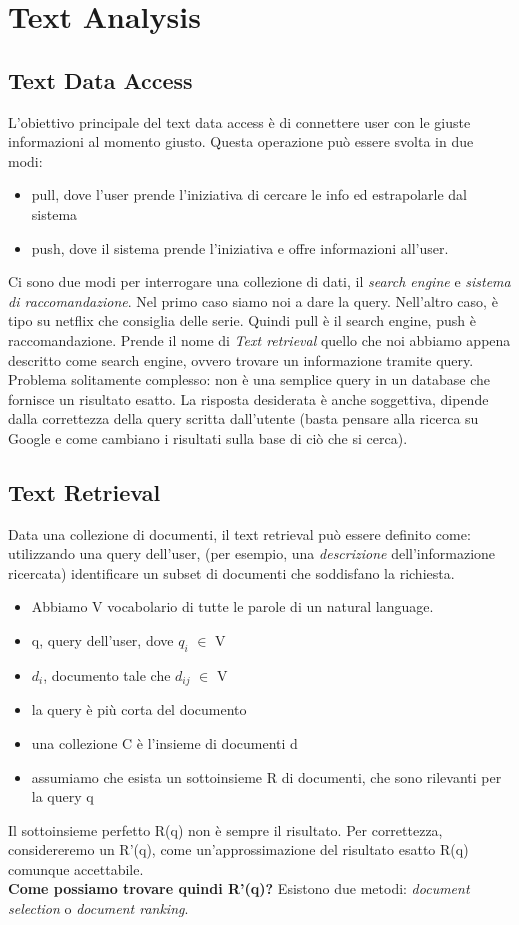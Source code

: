 \section{Text Analysis}
\subsection{Text Data Access}
L'obiettivo principale del text data access è di connettere user con le giuste informazioni al momento giusto. Questa operazione può essere svolta in due modi: \begin{itemize}
    \item pull, dove l'user prende l'iniziativa di cercare le info ed estrapolarle dal sistema
    \item push, dove il sistema prende l'iniziativa e offre informazioni all'user. 
\end{itemize}
Ci sono due modi per interrogare una collezione di dati, il \textit{search engine} e \textit{sistema di raccomandazione}. Nel primo caso siamo noi a dare la query. Nell'altro caso, è tipo su netflix che consiglia delle serie. Quindi pull è il search engine, push è raccomandazione. Prende il nome di \textit{Text retrieval} quello che noi abbiamo appena descritto come search engine, ovvero trovare un informazione tramite query. 
\\
Problema solitamente complesso: non è una semplice query in un database che fornisce un risultato esatto. La risposta desiderata è anche soggettiva, dipende dalla correttezza della query scritta dall'utente (basta pensare alla ricerca su Google e come cambiano i risultati sulla base di ciò che si cerca). 

\subsection{Text Retrieval}
Data una collezione di documenti, il text retrieval può essere definito come: utilizzando una query dell'user, (per esempio, una \textit{descrizione} dell'informazione ricercata) identificare un subset di documenti che soddisfano la richiesta. 
\begin{itemize}
    \item Abbiamo V vocabolario di tutte le parole di un natural language.
    \item q, query dell'user, dove $q_i$ $\in$ V
    \item $d_i$, documento tale che $d_{ij}$ $\in$ V
    \item la query è più corta del documento
    \item una collezione C è l'insieme di documenti d
    \item assumiamo che esista un sottoinsieme R di documenti, che sono rilevanti per la query q
\end{itemize}
Il sottoinsieme perfetto R(q) non è sempre il risultato. Per correttezza, considereremo un R'(q), come un'approssimazione del risultato esatto R(q) comunque accettabile. 
\\
\textbf{Come possiamo trovare quindi R'(q)?} Esistono due metodi: \textit{document selection} o \textit{document ranking}.

